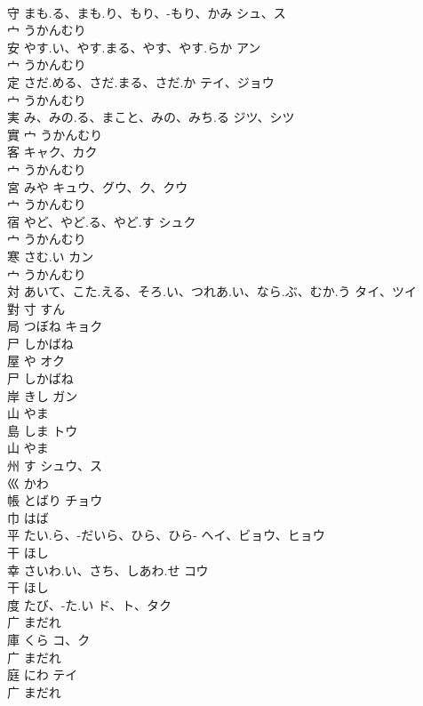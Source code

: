 \documentclass[8pt]{extreport}
\begin{document}
\begin{CJK}{UTF8}{min}
\\	守	まも.る、まも.り、もり、-もり、かみ	シュ、ス	
\\	宀		うかんむり		
\\	安	やす.い、やす.まる、やす、やす.らか	アン	
\\	宀		うかんむり		
\\	定	さだ.める、さだ.まる、さだ.か	テイ、ジョウ	
\\	宀		うかんむり		
\\	実	み、みの.る、まこと、みの、みち.る	ジツ、シツ	
\\	實	宀		うかんむり		
\\	客		キャク、カク	
\\	宀		うかんむり		
\\	宮	みや	キュウ、グウ、ク、クウ	
\\	宀		うかんむり		
\\	宿	やど、やど.る、やど.す	シュク	
\\	宀		うかんむり		
\\	寒	さむ.い	カン	
\\	宀		うかんむり		
\\	対	あいて、こた.える、そろ.い、つれあ.い、なら.ぶ、むか.う	タイ、ツイ	
\\	對	寸		すん		
\\	局	つぼね	キョク	
\\	尸		しかばね		
\\	屋	や	オク	
\\	尸		しかばね		
\\	岸	きし	ガン	
\\	山		やま		
\\	島	しま	トウ	
\\	山		やま		
\\	州	す	シュウ、ス	
\\	巛		かわ		
\\	帳	とばり	チョウ	
\\	巾		はば		
\\	平	たい.ら、-だいら、ひら、ひら-	ヘイ、ビョウ、ヒョウ	
\\	干		ほし		
\\	幸	さいわ.い、さち、しあわ.せ	コウ	
\\	干		ほし		
\\	度	たび、-た.い	ド、ト、タク	
\\	广		まだれ		
\\	庫	くら	コ、ク	
\\	广		まだれ		
\\	庭	にわ	テイ	
\\	广		まだれ		

\end{CJK}
\end{document}
